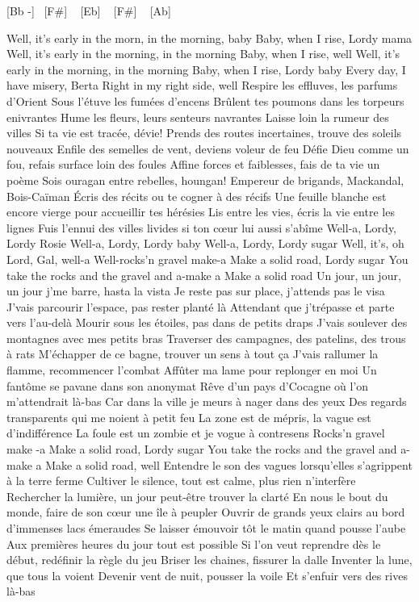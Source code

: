 [Bb -] ~[F#] ~ [Eb] ~ [F#] ~ [Ab] ~

Well, it's early in the morn, in the morning, baby
Baby, when I rise, Lordy mama
Well, it's early in the morning, in the morning
Baby, when I rise, well
Well, it's early in the morning, in the morning
Baby, when I rise, Lordy baby
Every day, I have misery, Berta
Right in my right side, well
Respire les effluves, les parfums d'Orient
Sous l'étuve les fumées d'encens
Brûlent tes poumons dans les torpeurs enivrantes
Hume les fleurs, leurs senteurs navrantes
Laisse loin la rumeur des villes
Si ta vie est tracée, dévie!
Prends des routes incertaines, trouve des soleils nouveaux
Enfile des semelles de vent, deviens voleur de feu
Défie Dieu comme un fou, refais surface loin des foules
Affine forces et faiblesses, fais de ta vie un poème
Sois ouragan entre rebelles, houngan!
Empereur de brigands, Mackandal, Bois-Caïman
Écris des récits ou te cogner à des récifs
Une feuille blanche est encore vierge pour accueillir tes hérésies
Lis entre les vies, écris la vie entre les lignes
Fuis l'ennui des villes livides si ton cœur lui aussi s'abîme
Well-a, Lordy, Lordy Rosie
Well-a, Lordy, Lordy baby
Well-a, Lordy, Lordy sugar
Well, it's, oh Lord, Gal, well-a
Well-rocks'n gravel make-a
Make a solid road, Lordy sugar
You take the rocks and the gravel and a-make a
Make a solid road
Un jour, un jour, un jour j'me barre, hasta la vista
Je reste pas sur place, j'attends pas le visa
J'vais parcourir l'espace, pas rester planté là
Attendant que j'trépasse et parte vers l'au-delà
Mourir sous les étoiles, pas dans de petits draps
J'vais soulever des montagnes avec mes petits bras
Traverser des campagnes, des patelins, des trous à rats
M'échapper de ce bagne, trouver un sens à tout ça
J'vais rallumer la flamme, recommencer l'combat
Affûter ma lame pour replonger en moi
Un fantôme se pavane dans son anonymat
Rêve d'un pays d'Cocagne où l'on m'attendrait là-bas
Car dans la ville je meurs à nager dans des yeux
Des regards transparents qui me noient à petit feu
La zone est de mépris, la vague est d'indifférence
La foule est un zombie et je vogue à contresens
Rocks'n gravel make -a
Make a solid road, Lordy sugar
You take the rocks and the gravel and a-make a
Make a solid road, well
Entendre le son des vagues lorsqu'elles s'agrippent à la terre ferme
Cultiver le silence, tout est calme, plus rien n'interfère
Rechercher la lumière, un jour peut-être trouver la clarté
En nous le bout du monde, faire de son cœur une île à peupler
Ouvrir de grands yeux clairs au bord d'immenses lacs émeraudes
Se laisser émouvoir tôt le matin quand pousse l'aube
Aux premières heures du jour tout est possible
Si l'on veut reprendre dès le début, redéfinir la règle du jeu
Briser les chaines, fissurer la dalle
Inventer la lune, que tous la voient
Devenir vent de nuit, pousser la voile
Et s'enfuir vers des rives là-bas